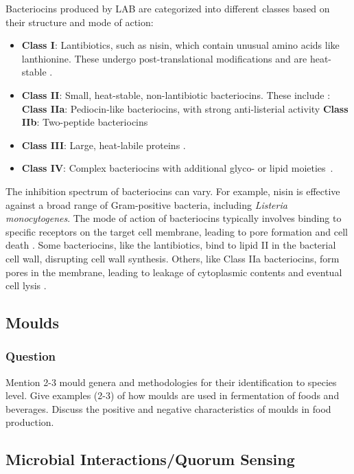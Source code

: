 Bacteriocins produced by LAB are categorized into different classes based on their structure and mode of action:
\begin{itemize}
    \item \textbf{Class I}: Lantibiotics, such as nisin, which contain unusual amino acids like lanthionine. These undergo post-translational modifications and are heat-stable \cite*{L3-LAB}.
    \item \textbf{Class II}: Small, heat-stable, non-lantibiotic bacteriocins. These include \cite*{L3-LAB}:
    \subitem \textbf{Class IIa}: Pediocin-like bacteriocins, with strong anti-listerial activity
    \subitem \textbf{Class IIb}: Two-peptide bacteriocins
    \item \textbf{Class III}: Large, heat-labile proteins \cite*{L8-MicroInFood}.
    \item \textbf{Class IV}: Complex bacteriocins with additional glyco- or lipid moieties \cite*{L8-MicroInFood}.
\end{itemize}

The inhibition spectrum of bacteriocins can vary. For example, nisin is effective against a broad range of Gram-positive bacteria, including \textit{Listeria monocytogenes}. The mode of action of bacteriocins typically involves binding to specific receptors on the target cell membrane, leading to pore formation and cell death \cite*{L3-LAB}. Some bacteriocins, like the lantibiotics, bind to lipid II in the bacterial cell wall, disrupting cell wall synthesis. Others, like Class IIa bacteriocins, form pores in the membrane, leading to leakage of cytoplasmic contents and eventual cell lysis \cite*{L3-LAB}.

\subsection{Moulds}
\subsubsection*{Question}
Mention 2-3 mould genera and methodologies for their identification to species level. Give examples (2-3) of how moulds are used in fermentation of foods and beverages. Discuss the positive and negative characteristics of moulds in food production. 

\subsection{Microbial Interactions/Quorum Sensing}
